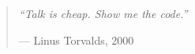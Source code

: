 \begin{quote}
    \itshape\large
    ``Talk is cheap. Show me the code.''
    \begin{flushright}
        \normalfont\normalsize --- Linus Torvalds, 2000
    \end{flushright}
\end{quote}